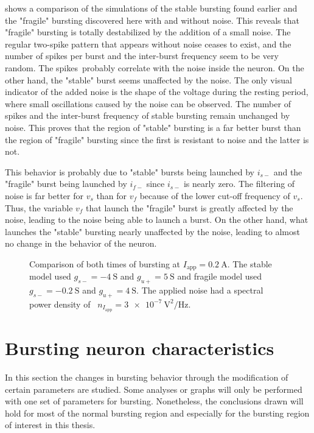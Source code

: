  shows a comparison of the simulations of the stable bursting found earlier and the "fragile" bursting discovered here with and without noise.
This reveals that "fragile" bursting is totally destabilized by the addition of a small noise.
The regular two-spike pattern that appears without noise ceases to exist, and the number of spikes per burst and the inter-burst frequency seem to be very random.
The spikes probably correlate with the noise inside the neuron.
On the other hand, the "stable" burst seems unaffected by the noise.
The only visual indicator of the added noise is the shape of the voltage during the resting period, where small oscillations caused by the noise can be observed.
The number of spikes and the inter-burst frequency of stable bursting remain unchanged by noise.
This proves that the region of "stable" bursting is a far better burst than the region of "fragile" bursting since the first is resistant to noise and the latter is not.

This behavior is probably due to "stable" bursts being launched by $i_{s-}$ and the "fragile" burst being launched by $i_{f-}$ since $i_{s-}$ is nearly zero.
The filtering of noise is far better for $v_s$ than for $v_f$ because of the lower cut-off frequency of $v_s$.
Thus, the variable $v_f$ that launch the "fragile" burst is greatly affected by the noise, leading to the noise being able to launch a burst.
On the other hand, what launches the "stable" bursting nearly unaffected by the noise, leading to almost no change in the behavior of the neuron.

\begin{figure}[!htb]
    \centering
    \caption{Comparison of both times of bursting at $I_\text{app}=\qty{0.2}{\ampere}$. The stable model used $g_{s-}=\qty{-4}{\siemens}$ and $g_{u+}=\qty{5}{\siemens}$ and fragile model used $g_{s-}=\qty{-0.2}{\siemens}$ and $g_{u+}=\qty{4}{\siemens}$. The applied noise had a spectral power density of  $n_{I_\text{app}} = \qty{3e-7}{\volt\squared\per\hertz}$.}
    \label{fig:neuron_burts_comp}
\end{figure}

\section{Bursting neuron characteristics}

In this section the changes in bursting behavior through the modification of certain parameters are studied.
Some analyses or graphs will only be performed with one set of parameters for bursting. Nonetheless, the conclusions drawn will hold for most of the normal bursting region and especially for the bursting region of interest in this thesis. 

